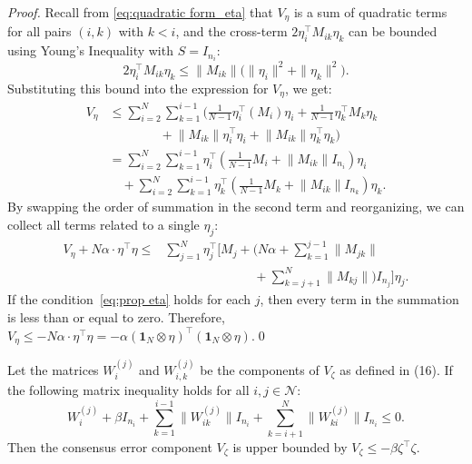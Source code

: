 \documentclass{ifacconf}
\begin{document}
\begin{proof}
Recall from \eqref{eq:quadratic form_eta} that $V_\eta$ is a sum of quadratic terms for all pairs $(i, k)$ with $k < i$, and the cross-term $2\eta_i^\top M_{ik} \eta_k$ can be bounded using Young's Inequality \citep{nguyen2016observer} with $S=I_{n_i}$:
$$
2\eta_i^\top M_{ik} \eta_k  \le \big\|M_{ik}\big\| \big(\|\eta_i\|^2 + \|\eta_k\|^2\big).
$$
Substituting this bound into the expression for $V_\eta$, we get:
\begin{align*}
V_\eta &\le \sum^N_{i=2}\sum^{i-1}_{k=1} \bigg( \frac{1}{N-1}\eta_i^\top (M_i) \eta_i + \frac{1}{N-1}\eta_k^\top M_k \eta_k \\
& \qquad \qquad  + \big\|M_{ik}\big\| \eta_i^\top \eta_i + \big\|M_{ik}\big\| \eta_k^\top \eta_k \bigg) \\
&=  \sum^N_{i=2}\sum^{i-1}_{k=1} \eta_i^\top \left( \frac{1}{N-1}M_i + \big\|M_{ik}\big\|I_{n_i} \right) \eta_i \\
& \quad + \sum^N_{i=2}\sum^{i-1}_{k=1} \eta_k^\top \left( \frac{1}{N-1}M_k +\big\|M_{ik}\big\|I_{n_k} \right) \eta_k.
\end{align*}
By swapping the order of summation in the second term and reorganizing, we can collect all terms related to a single $\eta_j$:
\begin{equation}
    \begin{aligned}
        V_\eta+N\alpha\cdot\eta^\top\eta\le&  \sum_{j=1}^{N} \eta_j^\top \bigg[M_j+\bigg(N\alpha+\sum_{k=1}^{j-1}\|M_{jk}\|\\
        &\qquad\qquad\qquad\quad  + \sum_{k=j+1}^{N}\|M_{kj}\|\bigg)I_{n_j} \bigg] \eta_j.
    \end{aligned}\nonumber
\end{equation}
If the condition~\eqref{eq:prop eta} holds for each $j$, then every term in the summation is less than or equal to zero. Therefore, $V_\eta \le -N\alpha\cdot\eta^\top\eta=-\alpha(\mathbf{1}_N\otimes\eta)^\top(\mathbf{1}_N\otimes\eta)$.\qed
\end{proof}
\begin{proposition}
    \label{prop:Vzeta}
        Let the matrices $W_i^{(j)}$ and $W_{i,k}^{(j)}$ be the components of $V_\zeta$ as defined in (16). If the following matrix inequality holds for all $i, j \in \mathcal{N}$:
    \begin{equation}
    W_i^{(j)}+\beta I_{n_i} + \sum_{k=1}^{i-1} \big\|W_{ik}^{(j)}\big\| I_{n_i} + \sum_{k=i+1}^{N} \big\|W_{ki}^{(j)}\big\| I_{n_i} \le 0.
    \label{eq:prop zeta}
    \end{equation}
    Then the consensus error component $V_\zeta$ is upper bounded by $V_\zeta \le -\beta\zeta^\top\zeta$.
\end{proposition}
\end{document}
